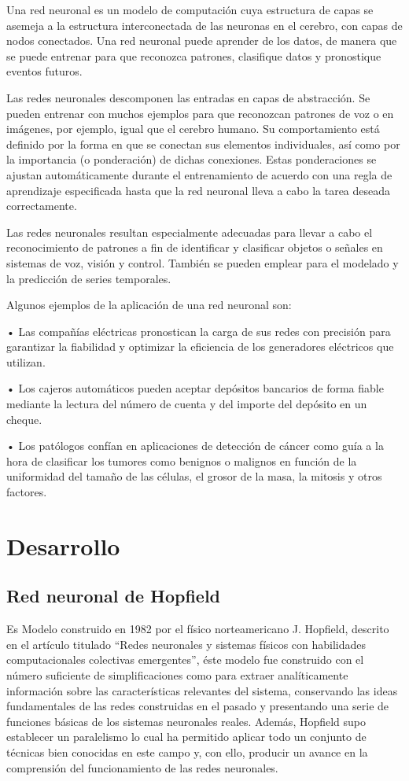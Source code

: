\documentclass[12pt]{article}
\begin{document}
Una red neuronal es un modelo de computación cuya estructura de capas se asemeja a la estructura interconectada de las neuronas en el cerebro, con capas de nodos conectados. Una red neuronal puede aprender de los datos, de manera que se puede entrenar para que reconozca patrones, clasifique datos y pronostique eventos futuros.

Las redes neuronales descomponen las entradas en capas de abstracción. Se pueden entrenar con muchos ejemplos para que reconozcan patrones de voz o en imágenes, por ejemplo, igual que el cerebro humano. Su comportamiento está definido por la forma en que se conectan sus elementos individuales, así como por la importancia (o ponderación) de dichas conexiones. Estas ponderaciones se ajustan automáticamente durante el entrenamiento de acuerdo con una regla de aprendizaje especificada hasta que la red neuronal lleva a cabo la tarea deseada correctamente.

Las redes neuronales resultan especialmente adecuadas para llevar a cabo el reconocimiento de patrones a fin de identificar y clasificar objetos o señales en sistemas de voz, visión y control. También se pueden emplear para el modelado y la predicción de series temporales.

Algunos ejemplos de la aplicación de una red neuronal son:

•	Las compañías eléctricas pronostican la carga de sus redes con precisión para garantizar la fiabilidad y optimizar la eficiencia de los generadores eléctricos que utilizan.

•	Los cajeros automáticos pueden aceptar depósitos bancarios de forma fiable mediante la lectura del número de cuenta y del importe del depósito en un cheque.

•	Los patólogos confían en aplicaciones de detección de cáncer como guía a la hora de clasificar los tumores como benignos o malignos en función de la uniformidad del tamaño de las células, el grosor de la masa, la mitosis y otros factores.

\section*{\Huge{Desarrollo}}

\subsection*{\LARGE{Red neuronal de Hopfield}}
Es Modelo construido en 1982 por el físico norteamericano J. Hopfield, descrito en el artículo titulado “Redes neuronales y sistemas físicos con habilidades computacionales colectivas emergentes”, éste modelo fue construido con el número suficiente de simplificaciones como para extraer analíticamente información sobre las características relevantes del sistema, conservando las ideas fundamentales de las redes construidas en el pasado y presentando una serie de funciones básicas de los sistemas neuronales reales. Además, Hopfield supo establecer un paralelismo lo cual ha permitido aplicar todo un conjunto de técnicas bien conocidas en este campo y, con ello, producir un avance en la comprensión del funcionamiento de las redes neuronales.
\end{document}
